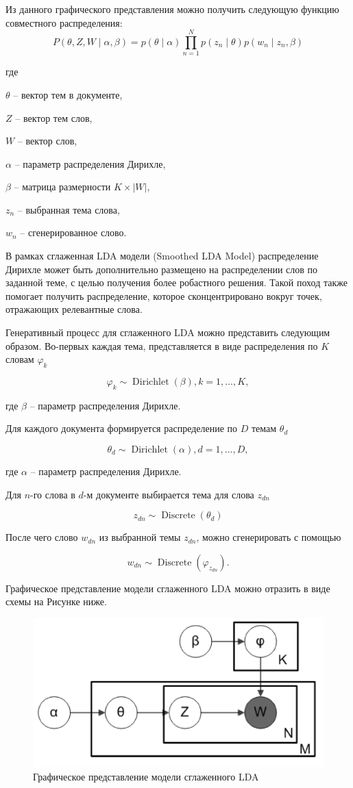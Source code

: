 \documentclass[12pt,a4paper, oneside]{extreport}
\begin{document}
Из данного графического представления можно получить следующую функцию совместного распределения:
$$
P(\theta, Z, W \mid \alpha, \beta)=p(\theta \mid \alpha) \prod_{n=1}^{N} p\left(z_{n} \mid \theta\right) p\left(w_{n} \mid z_{n}, \beta\right)
$$

где 

$\theta$ -- вектор тем в документе,

$Z$ -- вектор тем слов,

$W$ -- вектор слов, 

$\alpha$ -- параметр распределения Дирихле,

$\beta$ -- матрица размерности $K \times|W|$,

$z_{n}$ -- выбранная тема слова, 

$w_{n}$ -- сгенерированное слово.


В рамках сглаженная LDA модели (Smoothed LDA Model)
распределение Дирихле может  быть  дополнительно  размещено на распределении слов по заданной теме, с целью получения более робастного  решения. Такой поход также помогает получить распределение, которое  сконцентрировано вокруг точек, отражающих  релевантные слова. 


Генеративный процесс для сглаженного LDA можно представить следующим образом. Во-первых каждая  тема, представляется в виде распределения по $K$ словам $\varphi_{k}$

$$
\varphi_{k} \sim \operatorname{Dirichlet}(\beta), k=1, \ldots, K
,
$$

где $\beta$ -- параметр распределения Дирихле.
 

Для каждого документа формируется распределение по $D$ темам  $\theta_{d}$

$$
\theta_{d} \sim \operatorname{Dirichlet}(\alpha), d=1, \ldots, D,
$$

где $\alpha$ -- параметр распределения Дирихле.


Для $n$-го слова в $d$-м документе выбирается тема для слова $z_{d n} $

$$
z_{d n} \sim \operatorname{Discrete}\left(\theta_{d}\right)
$$

После чего слово $w_{d n}$ из выбранной темы $z_{d n} $, можно сгенерировать с помощью

$$
w_{d n} \sim \operatorname{Discrete}\left(\varphi_{z_{d n}}\right).
$$


Графическое представление модели сглаженного LDA можно отразить в виде схемы на Рисунке ниже. 

\begin{figure}[H]
	\centering
	\includegraphics[width=0.7\linewidth]{screenshot006}
	\caption{Графическое представление модели сглаженного LDA}
	\label{fig:screenshot006}
\end{figure}
\end{document}

